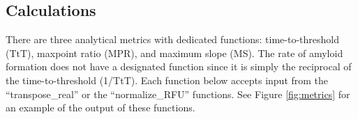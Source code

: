 \documentclass[preprint,12pt, a4paper]{elsarticle}
\begin{document}

    \subsection{Calculations}
        There are three analytical metrics with dedicated functions: time-to-threshold (TtT), maxpoint ratio (MPR), and maximum slope (MS). The rate of amyloid formation does not have a designated function since it is simply the reciprocal of the time-to-threshold (1/TtT). Each function below accepts input from the ``transpose\_real'' or the ``normalize\_RFU'' functions. See Figure \ref{fig:metrics} for an example of the output of these functions.
\end{document}
